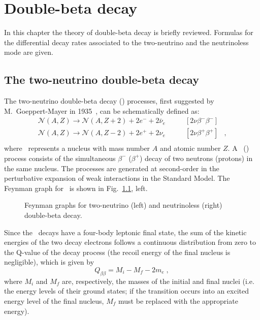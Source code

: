 \chapter{Double-beta decay}\label{chap:theory}

In this chapter the theory of double-beta decay is briefly reviewed. Formulas
for the differential decay rates associated to the two-neutrino and the
neutrinoless mode are given.

\section{The two-neutrino double-beta decay}

The two-neutrino double-beta decay (\nnbb) processes, first suggested by
M.~Goeppert-Mayer in 1935~\cite{GoeppertMayer1935}, can be schematically defined
as:
\[
  \begin{array}{lrl}
    \mathcal{N}(A,Z)\longrightarrow \mathcal{N}(A,Z+2)+2e^-+2\bar{\nu}_e &
      \qquad [2\nu\beta^-\beta^-] & \\
    \mathcal{N}(A,Z)\longrightarrow \mathcal{N}(A,Z-2)+2e^++2\nu_e &
      \qquad [2\nu\beta^+\beta^+] & ,\\
  \end{array}
\]
where \NAZ\ represents a nucleus with mass number $A$ and atomic number $Z$. A
\nnbbm\ (\nnbbp) process consists of the simultaneous $\beta^-$ ($\beta^+$)
decay of two neutrons (protons) in the same nucleus. The processes are
generated at second-order in the perturbative expansion of weak interactions in
the Standard Model. The Feynman graph for \nnbbm\ is shown in
Fig.~\cref{fig:nbb:feydiag}, left.

\begin{figure}
  \centering%
  \caption{%
    Feynman graphs for two-neutrino (left) and neutrinoless (right) double-beta
    decay.
  }\label{fig:nbb:feydiag}
\end{figure}

Since the \nnbb\ decays have a four-body leptonic final state, the sum of the
kinetic energies of the two decay electrons follows a continuous distribution
from zero to the Q-value of the decay process (the recoil energy of the final
nucleus is negligible), which is given by
\begin{equation}
  Q_{\beta\beta} = M_i - M_f - 2m_e \;,
\end{equation}
where $M_i$ and $M_f$ are, respectively, the masses of the initial and final
nuclei (i.e. the energy levels of their ground states; if the transition occurs
into an excited energy level of the final nucleus, $M_f$ must be replaced with
the appropriate energy).

